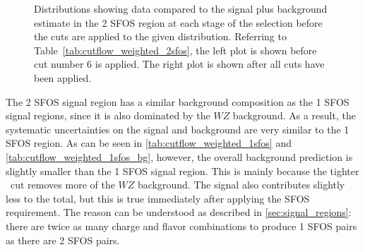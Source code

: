 \begin{figure}[ht!]
\caption{Distributions showing data compared to the signal plus background estimate in the 2 SFOS region at each stage 
of the selection before the cuts are applied to the given distribution. 
Referring to Table~\ref{tab:cutflow_weighted_2sfos}, the left
plot is shown before cut number 6 is applied. The right plot is shown
after all cuts have been applied.}
\label{fig:2sfos_2}
\end{figure}


The 2 SFOS signal region has a similar background composition as
the 1 SFOS signal regions, since it is also dominated by 
the $WZ$ background.  As a result, the systematic uncertainties
on the signal and background are very similar to the 1 SFOS region.
As can be seen
in
\tab\ref{tab:cutflow_weighted_1sfos}
and 
\tab\ref{tab:cutflow_weighted_1sfos_bg},
however,
the overall background prediction
is slightly smaller than the 1 SFOS signal region.
This is 
mainly because the tighter \MET~cut removes more of the $WZ$ background.
The signal 
also contributes slightly less to the total,
but this is true
immediately after applying the SFOS requirement.
The reason can be understood 
as described in \sec\ref{sec:signal_regions}:
there are twice as many charge and flavor combinations to produce
1 SFOS pairs as there are 2 SFOS pairs.


